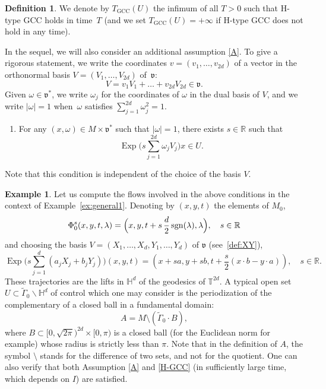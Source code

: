 \documentclass[10pt]{amsart}
\newcommand{\GCC}{\mathrm{GCC}}
\DeclareMathOperator{\Exp}{Exp}
\DeclareMathOperator{\sgn}{sgn}
\theoremstyle{plain}
\theoremstyle{definition}
\newtheorem{definition}[theorem]{Definition}
\newtheorem{example}[theorem]{Example}
\def\R{{\mathbb R}}
\def\T{{\mathbb T}}
\def\bbH{{\mathbb H}}
\begin{document}
\begin{definition}
We denote by $T_\GCC(U)$ the infimum of all $T>0$ such that H-type GCC holds in time~$T$ (and we set $T_\GCC(U)=+\infty$ if H-type GCC does not hold in any time).
\end{definition}

In the sequel, we will also consider an additional assumption \eqref{A}.
To give a rigorous statement, we write the coordinates $v=(v_1,\ldots,v_{2d})$ of a vector in the orthonormal basis $V=(V_1,\ldots, V_{2d})$ of~$\mathfrak v$:
\[
V=v_1V_1 +\ldots + v_{2d} V_{2d}\in \mathfrak v.
\]
Given $\omega\in\mathfrak v^*$, we write $\omega_j$ for the coordinates of $\omega$ in the dual basis of $V$, and we write $|\omega|=1$ when~$\omega$ satisfies $\sum_{j=1}^{2d}\omega_j^2=1$.
\begin{enumerate}\renewcommand{\theenumi}{A}
\item\label{A}
For any $(x,\omega)\in M\times \mathfrak v^*$ such that $|\omega|=1$, there exists $s\in\R$ such that
\[\textstyle
\Exp \bigl(s\sum_{j=1}^{2d}\omega_jV_j \bigr) x \in U.
\]
\end{enumerate}

Note that this condition is independent of the choice of the basis $V$.

\begin{example}\label{ex:general2}
Let us compute the flows involved in the above conditions in the context of Example~\ref{ex:general1}. Denoting by $(x,y,t)$ the elements of $M_0$,
\[
\Phi^s_0 (x,y,t,\lambda)=\Bigl(x,y, t+s\,\frac d2 \sgn (\lambda), \lambda\Bigr),\quad s\in\R
\]
and choosing the basis $V=(X_1,\dots,X_d,Y_1,\dots, Y_d) $ of $\mathfrak v$ (see~\eqref{def:XY}),
\[\textstyle
\Exp \bigl(s\sum_{j=1}^{d}(a_jX_j +b_jY_j)\bigr) (x,y,t)= \left(x+ sa,y+sb,t+\dfrac s2(x\cdot b-y\cdot a) \right),\quad s\in\R.
\]
These trajectories are the lifts in $\bbH^d$ of the geodesics of $\T^{2d}$.
A typical open set \hbox{$U\subset \widetilde{\Gamma}_0\backslash \bbH^d$} of control which one may consider is the periodization of the complementary of a closed ball in a fundamental domain:
\[
A=M\setminus (\widetilde{\Gamma}_0 \cdot B),
\]
where $B\subset [0,\sqrt{2\pi})^{2d}\times [0,\pi)$ is a closed ball (for the Euclidean norm for example) whose radius is strictly less than $\pi$. Note that in the definition of $A$, the symbol $\setminus$ stands for the difference of two sets, and not for the quotient.
One can also
verify that both Assumption \eqref{A} and \eqref{H-GCC} (in sufficiently large time, which depends on $I$) are satisfied.
\end{example}
\end{document}
